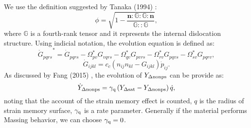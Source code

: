 We use the definition suggested by Tanaka (1994) \cite{tanaka1994nonproportionality}:
\begin{equation}
\phi  = \sqrt {1 - \frac{{{\mathbf{n}}:\mathbb{G}:\mathbb{G}:{\mathbf{n}}}}{{\mathbb{G}::\mathbb{G}}}},
\end{equation}
where $\mathbb{G}$ is a fourth-rank tensor and it represents the internal dislocation structure.
Using indicial notation, the evolution equation is defined as:
\begin{equation}
{\mathring G _{pqrs}}^* = {{\dot G}_{pqrs}} - \Omega _{pv}^*{G_{vqrs}} - \Omega _{qv}^*{G_{pvrs}} - \Omega _{rv}^*{G_{pqvs}} - \Omega _{sv}^*{G_{pqrv}},
\end{equation}
\begin{equation}
{{\dot G}_{ijkl}} = {c_c}\left( {{n_{ij}}{n_{kl}} - {G_{ijkl}}} \right){{\dot p}_{ij}}.
\end{equation}
As discussed by Fang (2015) \cite{fang2015cyclic}, the evolution of ${Y_{\Delta \rm nonps}}$ can be provide as:
\begin{equation}
{\dot Y_{\Delta \rm nonps}} = {\gamma _{\rm q}}\left( {{Y_{\Delta \rm sat}} - {Y_{\Delta \rm nonps}}} \right)\dot q,
\end{equation}
noting that the account of the strain memory effect is counted, $q$ is the radius of strain memory surface, ${\gamma _{\rm q}}$ is a rate parameter.
Generally if the material performs Massing behavior, we can choose ${\gamma _{\rm q}}=0$.

